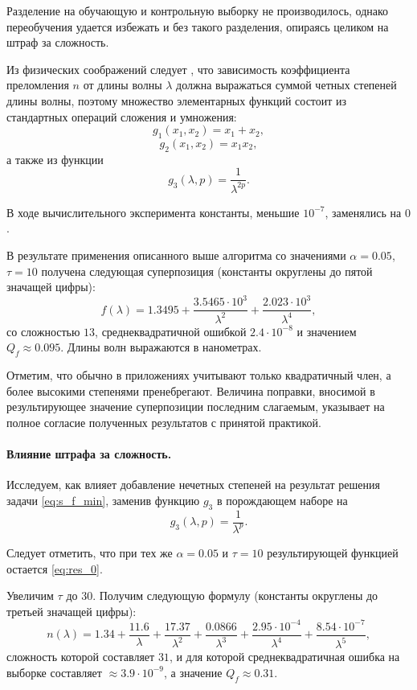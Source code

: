 \documentclass[11pt,a4paper]{article}
\theoremstyle{definition}
\begin{document}
Разделение на обучающую и контрольную выборку не производилось, однако переобучения
удается избежать и без такого разделения, опираясь целиком на штраф за сложность.

Из физических соображений следует \cite{Serova11}, что зависимость коэффициента
преломления $n$ от длины волны $\lambda$ должна выражаться суммой
четных степеней длины волны, поэтому множество элементарных функций состоит из
стандартных операций сложения и умножения:
\[
  g_1(x_1, x_2) = x_1 + x_2,
\]
\[
  g_2(x_1, x_2) = x_1 x_2,
\]
а также из функции
\[
  g_3(\lambda, p) = \frac{1}{\lambda^{2p}}.
\]

В ходе вычислительного эксперимента константы, меньшие $10^{-7}$,
заменялись на $0$.

В результате применения описанного выше алгоритма со значениями
$\alpha = 0.05$, $\tau = 10$ получена следующая суперпозиция
(константы округлены до пятой значащей цифры):
\begin{equation}
  f(\lambda) = 1.3495 + \frac{3.5465 \cdot 10^3}{\lambda^2} + \frac{2.023 \cdot 10^3}{\lambda^4},
  \label{eq:res_0}
\end{equation}
со сложностью $13$, среднеквадратичной ошибкой $2.4 \cdot 10^{-8}$ и значением $Q_f \approx 0.095$.
Длины волн выражаются в нанометрах.

Отметим, что обычно в приложениях учитывают только квадратичный член, а более
высокими степенями пренебрегают. Величина поправки, вносимой в результирующее значение
суперпозиции последним слагаемым, указывает на полное согласие полученных результатов
с принятой практикой.

\paragraph{Влияние штрафа за сложность.}

Исследуем, как влияет добавление нечетных степеней на результат решения задачи \eqref{eq:s_f_min},
заменив функцию $g_3$ в порождающем наборе на
\[
  g_3(\lambda, p) = \frac{1}{\lambda^p}.
\]

Следует отметить, что при тех же $\alpha = 0.05$ и $\tau = 10$ результирующей функцией остается
\eqref{eq:res_0}.

Увеличим $\tau$ до 30. Получим следующую формулу (константы округлены до третьей значащей цифры):
\begin{equation}
  n(\lambda) = 1.34 + \frac{11.6}{\lambda} + \frac{17.37}{\lambda^2} + \frac{0.0866}{\lambda^3} + \frac{2.95 \cdot 10^{-4}}{\lambda^4} + \frac{8.54 \cdot 10^{-7}}{\lambda^5},
  \label{eq:res_incorrect}
\end{equation}
сложность которой составляет $31$, и для которой среднеквадратичная ошибка
на выборке составляет $\approx 3.9 \cdot 10^{-9}$,
а значение $Q_f \approx 0.31$.
\end{document}
